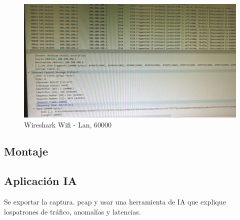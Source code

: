 \begin{figure}[H]
    \centering
    \includegraphics[width=\columnwidth]{punto1/p1_ws_wifi_lan_60k.jpeg}
    \caption{Wireshark Wifi - Lan, 60000}
    \label{fig:ws_wifi_lan_6k}
\end{figure}

\subsection{Montaje}


\subsection{Aplicación IA}
Se exportar la captura. pcap y usar una herramienta de IA que explique lospatrones de tráfico, anomalías y latencias.
